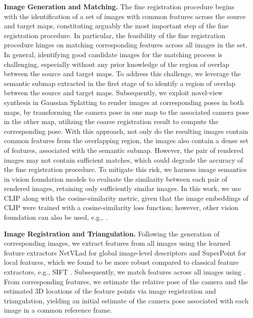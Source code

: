 \smallskip
\noindent\textbf{Image Generation and Matching.}
The fine registration procedure begins with the identification of a set of images with common features across the source and target maps, constituting arguably the most important step of the fine registration procedure. In particular, the feasibility of the fine registration procedure hinges on matching corresponding features across all images in the set. In general, identifying good candidate images for the matching process is challenging, especially without any prior knowledge of the region of overlap between the source and target maps. To address this challenge, we leverage the semantic submap extracted in the first stage of \algname to identify a region of overlap between the source and target maps. Subsequently, we exploit novel-view synthesis in Gaussian Splatting to render images at corresponding poses in both maps, by transforming the camera pose in one map to the associated camera pose in the other map, utilizing the coarse registration result to compute the corresponding pose. With this approach, not only do the resulting images contain common features from the overlapping region, the images also contain a dense set of features, associated with the semantic submap. However, the pair of rendered images may not contain sufficient matches, which could degrade the accuracy of the fine registration procedure. To mitigate this risk, we harness image semantics in vision foundation models to evaluate the similarity between each pair of rendered images, retaining only sufficiently similar images. In this work, we use CLIP along with the cosine-similarity metric, given that the image embeddings of CLIP were trained with a cosine-similarity loss function; however, other vision foundation can also be used, e.g., \cite{caron2021emerging}.


\smallskip
\noindent\textbf{Image Registration and Triangulation.}
Following the generation of corresponding images, we extract features from all images using the learned feature extractors NetVLad \cite{arandjelovic2016netvlad} for global image-level descriptors and SuperPoint \cite{sarlin2020superglue} for local features, which we found to be more robust compared to classical feature extractors, e.g., SIFT \cite{karami2017image}. Subsequently, we match features across all images using \cite{sarlin2020superglue}. From corresponding features, we estimate the relative pose of the camera and the estimated $3$D locations of the feature points via image registration and triangulation, yielding an initial estimate of the camera pose associated with each image in a common reference frame.


